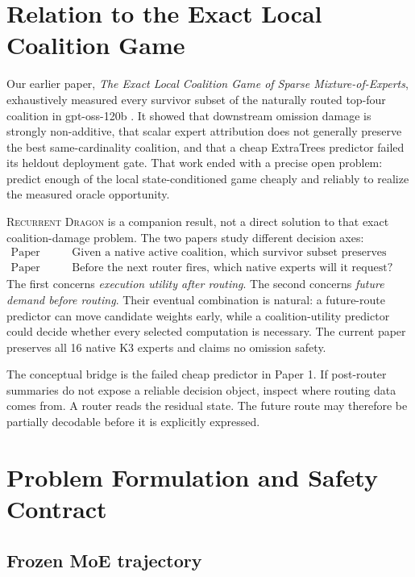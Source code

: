 \documentclass[11pt]{article}
\newcommand{\Dragon}{\textsc{Recurrent Dragon}\xspace}
\begin{document}
\section{Relation to the Exact Local Coalition Game}

Our earlier paper, \emph{The Exact Local Coalition Game of Sparse Mixture-of-Experts}, exhaustively measured every survivor subset of the naturally routed top-four coalition in gpt-oss-120b \citep{castorenaCoalition2026}. It showed that downstream omission damage is strongly non-additive, that scalar expert attribution does not generally preserve the best same-cardinality coalition, and that a cheap ExtraTrees predictor failed its heldout deployment gate. That work ended with a precise open problem: predict enough of the local state-conditioned game cheaply and reliably to realize the measured oracle opportunity.

\Dragon is a companion result, not a direct solution to that exact coalition-damage problem. The two papers study different decision axes:
\begin{align}
\text{Paper 1:}&\quad \text{Given a native active coalition, which survivor subset preserves output?}\\
\text{Paper 2:}&\quad \text{Before the next router fires, which native experts will it request?}
\end{align}
The first concerns \emph{execution utility after routing}. The second concerns \emph{future demand before routing}. Their eventual combination is natural: a future-route predictor can move candidate weights early, while a coalition-utility predictor could decide whether every selected computation is necessary. The current paper preserves all 16 native K3 experts and claims no omission safety.

The conceptual bridge is the failed cheap predictor in Paper 1. If post-router summaries do not expose a reliable decision object, inspect where routing data comes from. A router reads the residual state. The future route may therefore be partially decodable before it is explicitly expressed.

\section{Problem Formulation and Safety Contract}

\subsection{Frozen MoE trajectory}
\end{document}
